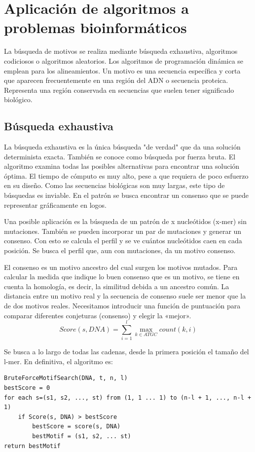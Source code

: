 \chapter{Aplicación de algoritmos a problemas bioinformáticos}
La búsqueda de motivos se realiza mediante búsqueda exhaustiva, algoritmos codiciosos o algoritmos aleatorios. Los algoritmos de programación dinámica se emplean para los alineamientos. Un motivo es una secuencia específica y corta que aparecen frecuentemente en una región del ADN o secuencia proteica. Representa una región conservada en secuencias que suelen tener significado biológico. 

\section{Búsqueda exhaustiva}
La búsqueda exhaustiva es la única búsqueda "de verdad" que da una solución determinista exacta. También se conoce como búsqueda por fuerza bruta. El algoritmo examina todas las posibles alternativas para encontrar una solución óptima. El tiempo de cómputo es muy alto, pese a que requiera de poco esfuerzo en su diseño. Como las secuencias biológicas son muy largas, este tipo de búsquedas es inviable. 
En el patrón se busca encontrar un consenso que se puede representar gráficamente en logos. 

Una posible aplicación es la búsqueda de un patrón de x nucleótidos (x-mer) sin mutaciones. También se pueden incorporar un par de mutaciones y generar un consenso. Con esto se calcula el perfil y se ve cuántos nucleótidos caen en cada posición. Se busca el perfil que, aun con mutaciones, da un motivo consenso. 

El consenso es un motivo ancestro del cual surgen los motivos mutados. Para calcular la medida que indique lo buen consenso que es un motivo, se tiene en cuenta la homología, es decir, la similitud debida a un ancestro común. La distancia entre un motivo real y la secuencia de consenso suele ser menor que la de dos motivos reales. Necesitamos introducir una función de puntuación para comparar diferentes conjeturas (consenso) y elegir la «mejor». 
$$Score(s, DNA) = \sum^l_{i = 1} \max_{k \in A T G C} count(k, i)$$

Se busca a lo largo de todas las cadenas, desde la primera posición el tamaño del l-mer. En definitiva, el algoritmo es:
\begin{lstlisting}
BruteForceMotifSearch(DNA, t, n, l)
bestScore = 0
for each s=(s1, s2, ..., st) from (1, 1 ... 1) to (n-l + 1, ..., n-l + 1)
	if Score(s, DNA) > bestScore
		bestScore = score(s, DNA)
		bestMotif = (s1, s2, ... st)
return bestMotif
\end{lstlisting}

